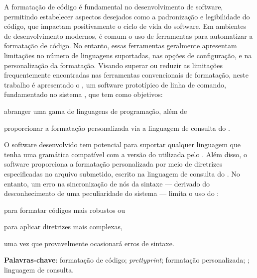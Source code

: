 \documentclass
  [11pt,a4paper,english,brazil,openright,sumario=tradicional,twoside]
  {abntex2}
\begin{document}
  \begin{resumo}
    A formatação de código é fundamental no desenvolvimento de software,
    permitindo estabelecer aspectos desejados como a padronização e
    legibilidade do código, que impactam positivamente o ciclo de vida do
    software. Em ambientes de desenvolvimento modernos, é comum o uso de
    ferramentas para automatizar a formatação de código. No entanto, essas
    ferramentas geralmente apresentam limitações no número de linguagens
    suportadas, nas opções de configuração, e na personalização da formatação.
    Visando superar ou reduzir as limitações frequentemente encontradas nas
    ferramentas convencionais de formatação, neste trabalho é apresentado o
    \witchcooking, um software prototípico de linha de comando, fundamentado no
    sistema \treesitter, que tem como objetivos:
    \begin{inparaenum}
      \item abranger uma gama de linguagens de programação, além de
      \item proporcionar a formatação personalizada via a linguagem de consulta
            do \treesitter.
    \end{inparaenum}
    O software desenvolvido tem potencial para suportar qualquer linguagem que
    tenha uma gramática compatível com a versão do \treesitter utilizada pelo
    \witchcooking. Além disso, o software proporciona a formatação
    personalizada por meio de diretrizes especificadas no arquivo submetido,
    escrito na linguagem de consulta do \treesitter. No entanto, um erro na
    sincronização de nós da sintaxe --- derivado do desconhecimento de uma
    peculiaridade do sistema \treesitter{} --- limita o uso do \witchcooking:
    \begin{inparaenum}
      \item para formatar códigos mais robustos ou
      \item para aplicar diretrizes mais complexas,
    \end{inparaenum}
    uma vez que provavelmente ocasionará erros de sintaxe.

    \noindent
    \textbf{Palavras-chave}:
    formatação de código;
    \textit{prettyprint};
    formatação personalizada;
    \treesitter;
    linguagem de consulta.
  \end{resumo}

\end{document}
